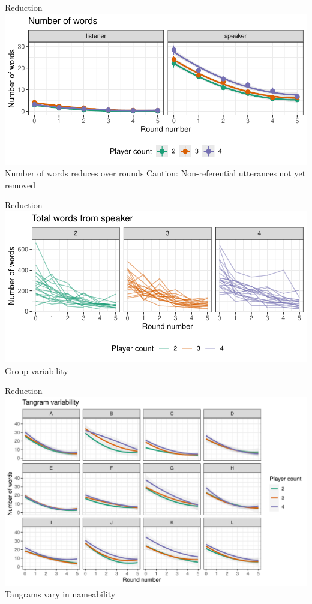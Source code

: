\documentclass[ 12pt, xcolor=beamer,table,usenames,dvipsnames, ignorenonframetext, ngerman]{beamer}
\begin{document}
\begin{frame}{Reduction}
\includegraphics[width=\textwidth]{../images/words.pdf}
Number of words reduces over rounds
Caution: Non-referential utterances not yet removed
\end{frame}

\begin{frame}{Reduction}
	\includegraphics[width=\textwidth]{../images/words_lines.pdf}
Group variability
\end{frame}

\begin{frame}{Reduction}
	\includegraphics[width=\textwidth]{../images/words_tangrams.pdf}
Tangrams vary in nameability
\end{frame}
\end{document}
